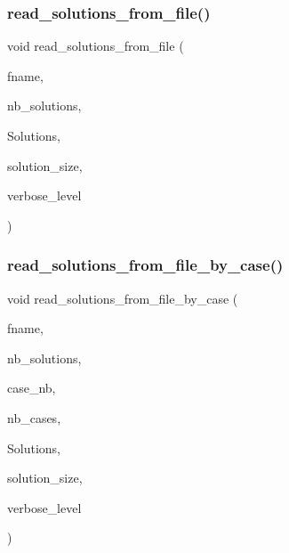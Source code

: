 \subsubsection{\texorpdfstring{read\+\_\+solutions\+\_\+from\+\_\+file()}{read\_solutions\_from\_file()}}
{\footnotesize\ttfamily void read\+\_\+solutions\+\_\+from\+\_\+file (\begin{DoxyParamCaption}\item[{const \mbox{\hyperlink{galois_8h_ab6cc7b4aeb6ea31aba2b3fbfc83ff5e6}{B\+Y\+TE}} $\ast$}]{fname,  }\item[{\mbox{\hyperlink{galois_8h_a09fddde158a3a20bd2dcadb609de11dc}{I\+NT}} \&}]{nb\+\_\+solutions,  }\item[{\mbox{\hyperlink{galois_8h_a09fddde158a3a20bd2dcadb609de11dc}{I\+NT}} $\ast$\&}]{Solutions,  }\item[{\mbox{\hyperlink{galois_8h_a09fddde158a3a20bd2dcadb609de11dc}{I\+NT}}}]{solution\+\_\+size,  }\item[{\mbox{\hyperlink{galois_8h_a09fddde158a3a20bd2dcadb609de11dc}{I\+NT}}}]{verbose\+\_\+level }\end{DoxyParamCaption})}

\mbox{\label{util_8_c_a0e4fdb84a9ae414bce77585fc34ace1f}} 
\subsubsection{\texorpdfstring{read\+\_\+solutions\+\_\+from\+\_\+file\+\_\+by\+\_\+case()}{read\_solutions\_from\_file\_by\_case()}}
{\footnotesize\ttfamily void read\+\_\+solutions\+\_\+from\+\_\+file\+\_\+by\+\_\+case (\begin{DoxyParamCaption}\item[{const \mbox{\hyperlink{galois_8h_ab6cc7b4aeb6ea31aba2b3fbfc83ff5e6}{B\+Y\+TE}} $\ast$}]{fname,  }\item[{\mbox{\hyperlink{galois_8h_a09fddde158a3a20bd2dcadb609de11dc}{I\+NT}} $\ast$}]{nb\+\_\+solutions,  }\item[{\mbox{\hyperlink{galois_8h_a09fddde158a3a20bd2dcadb609de11dc}{I\+NT}} $\ast$}]{case\+\_\+nb,  }\item[{\mbox{\hyperlink{galois_8h_a09fddde158a3a20bd2dcadb609de11dc}{I\+NT}}}]{nb\+\_\+cases,  }\item[{\mbox{\hyperlink{galois_8h_a09fddde158a3a20bd2dcadb609de11dc}{I\+NT}} $\ast$$\ast$\&}]{Solutions,  }\item[{\mbox{\hyperlink{galois_8h_a09fddde158a3a20bd2dcadb609de11dc}{I\+NT}}}]{solution\+\_\+size,  }\item[{\mbox{\hyperlink{galois_8h_a09fddde158a3a20bd2dcadb609de11dc}{I\+NT}}}]{verbose\+\_\+level }\end{DoxyParamCaption})}

